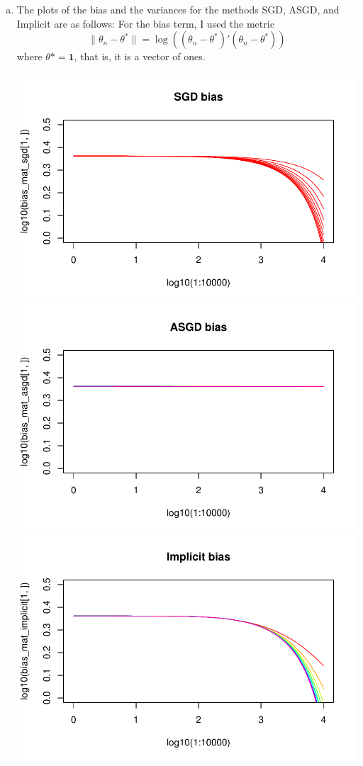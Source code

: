 \documentclass[letterpaper,10pt]{amsart}
\begin{document}
\begin{enumerate}[1.]
\begin{enumerate}[(a)]
\item 
The plots of the bias and the variances for the methods SGD, ASGD, and Implicit are as follows: For the bias term, I used the metric 
\[\|\theta_n - \theta^*\| = \log((\theta_n - \theta^*)'(\theta_n - \theta^*)) \]
where $\theta* = \boldsymbol 1$, that is, it is a vector of ones.
\begin{center}
\includegraphics[scale=0.4]{2cbias1.pdf}
\includegraphics[scale=0.4]{2cbias2.pdf}
\includegraphics[scale=0.4]{2cbias3.pdf}
\end{center}


\end{enumerate}
\end{enumerate}
\end{document}
